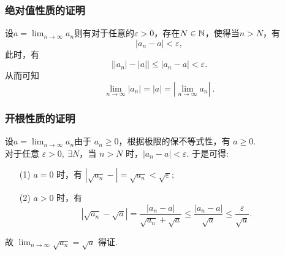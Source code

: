 \documentclass[mathserif]{beamer}
\begin{document}


\begin{frame}[label=jdzjszm]
	\frametitle{绝对值性质的证明\hfill\hyperlink{jsbuchong<1>}{}}
	\begin{proofs}
		\suojin 设$a=\lim_{n\rightarrow\infty}a_n$\jh 则有对于任意的$\varepsilon>0$，存在$N\in\mathbb{N}$，使得当$n>N$，有
		$$\left|a_{n}-a\right|<\varepsilon,$$
		此时，有
		$$\left|\left|a_{n}\right|-\left|a\right|\right|\leqslant \left|a_{n}-a\right|<\varepsilon.$$
		从而可知
		$$\lim_{n\rightarrow\infty}|a_n|=\left|a\right|=|\lim_{n\rightarrow\infty}a_n|\ .$$
	\end{proofs}
\end{frame}




\begin{frame}[label=kgjszm]
	\frametitle{开根性质的证明\hfill\hyperlink{jsbuchong<1>}{}}
	\begin{proofs}
		\suojin 设$a=\lim_{n\rightarrow\infty}a_n$\jh 由于 $a_n \geqslant 0$，根据极限的保不等式性，有 $a \geqslant 0$. \\
		\suojin 对于任意 $\varepsilon>0,\ \exists N$，当 $n>N$ 时，$\left|a_n-a\right|<\varepsilon$. 于是可得:
		\begin{itemize}
			\item[(1)] $a=0$ 时，有 $\left|\sqrt{a_n}-\right|=\sqrt{a_n}<\sqrt{\varepsilon}$;
			\item[(2)] $a>0$ 时，有
			$$
			\left|\sqrt{a_n}-\sqrt{a}\right|=\frac{\left|a_n-a\right|}{\sqrt{a_n}+\sqrt{a}} \leq \frac{\left|a_n-a\right|}{\sqrt{a}} \leq \frac{\varepsilon}{\sqrt{a}} .
			$$
		\end{itemize}
		
		故 $\lim _{n \rightarrow \infty} \sqrt{a_n}=\sqrt{a}$ 得证. 
	\end{proofs}
\end{frame}
\end{document}
